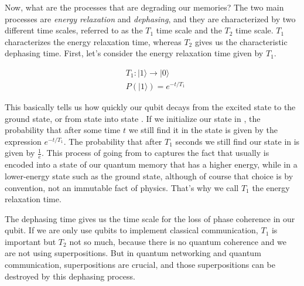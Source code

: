 Now, what are the processes that are degrading our memories? The two main processes are \emph{energy relaxation} and \emph{dephasing}, and they are characterized by two different time scales, referred to as the $T_1$ time scale and the $T_2$ time scale.  $T_1$ characterizes the energy relaxation time, whereas $T_2$ gives us the characteristic dephasing time. First, let's consider the energy relaxation time given by $T_1$.

\begin{equation}
\begin{aligned}
&T_1:|1\rangle \rightarrow|0\rangle \\
&P(|1\rangle)=e^{-t / T_1}
\end{aligned}
\end{equation}

This basically tells us how quickly our qubit decays from the excited state to the ground state, or from state  into state . If we initialize our state in , the probability that after some time $t$ we still find it in the state  is given by the expression $e^{-t/T_1}$. The probability that after $T_1$ seconds we still find our state in  is given by $\frac{1}{e}$. This process of going from  to  captures the fact that usually  is encoded into a state of our quantum memory that has a higher energy, while  in a lower-energy state such as the ground state, although of course that choice is by convention, not an immutable fact of physics.  That's why we call $T_1$ the energy relaxation time.

The dephasing time gives us the time scale for the loss of phase coherence in our qubit. If we are only use qubits to implement classical communication,  $T_1$ is important but  $T_2$ not so much, because there is no quantum coherence and we are not using superpositions. But in quantum networking and quantum communication, superpositions are crucial, and those superpositions can be destroyed by this dephasing process.

